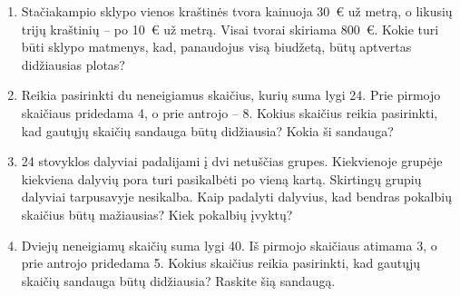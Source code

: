 \documentclass[11pt,a4paper]{article}
\begin{document}
\begin{enumerate}[start=3]
\item \begin{minipage}[t]{\linewidth}Stačiakampio sklypo vienos kraštinės tvora kainuoja 30~€ už metrą, o likusių trijų kraštinių -- po 10~€ už metrą. Visai tvorai skiriama 800~€. Kokie turi būti sklypo matmenys, kad, panaudojus visą biudžetą, būtų aptvertas didžiausias plotas?\end{minipage}
\item \begin{minipage}[t]{\linewidth}Reikia pasirinkti du neneigiamus skaičius, kurių suma lygi 24. Prie pirmojo skaičiaus pridedama 4, o prie antrojo -- 8. Kokius skaičius reikia pasirinkti, kad gautųjų skaičių sandauga būtų didžiausia? Kokia ši sandauga?\end{minipage}
\item \begin{minipage}[t]{\linewidth}24 stovyklos dalyviai padalijami į dvi netuščias grupes. Kiekvienoje grupėje kiekviena dalyvių pora turi pasikalbėti po vieną kartą. Skirtingų grupių dalyviai tarpusavyje nesikalba. Kaip padalyti dalyvius, kad bendras pokalbių skaičius būtų mažiausias? Kiek pokalbių įvyktų?\end{minipage}
\item \begin{minipage}[t]{\linewidth}Dviejų neneigiamų skaičių suma lygi 40. Iš pirmojo skaičiaus atimama 3, o prie antrojo pridedama 5. Kokius skaičius reikia pasirinkti, kad gautųjų skaičių sandauga būtų didžiausia? Raskite šią sandaugą.\end{minipage}
\end{enumerate}
\end{document}
